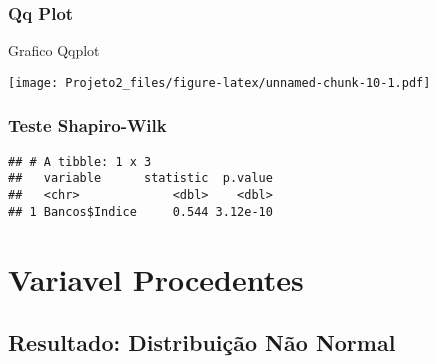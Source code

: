 \documentclass[
]{article}
\newenvironment{Shaded}{\begin{snugshade}}{\end{snugshade}}
\newcommand{\AttributeTok}[1]{\textcolor[rgb]{0.77,0.63,0.00}{#1}}
\newcommand{\FunctionTok}[1]{\textcolor[rgb]{0.00,0.00,0.00}{#1}}
\newcommand{\NormalTok}[1]{#1}
\newcommand{\SpecialCharTok}[1]{\textcolor[rgb]{0.00,0.00,0.00}{#1}}
\newcommand{\StringTok}[1]{\textcolor[rgb]{0.31,0.60,0.02}{#1}}
\begin{document}
\hypertarget{qq-plot}{%
\subsubsection{Qq Plot}\label{qq-plot}}

Grafico Qqplot

\begin{Shaded}
\end{Shaded}

\texttt{[image: Projeto2\_files/figure-latex/unnamed-chunk-10-1.pdf]}

\hypertarget{teste-shapiro-wilk}{%
\subsubsection{Teste Shapiro-Wilk}\label{teste-shapiro-wilk}}

\begin{Shaded}
\end{Shaded}

\begin{verbatim}
## # A tibble: 1 x 3
##   variable      statistic  p.value
##   <chr>             <dbl>    <dbl>
## 1 Bancos$Indice     0.544 3.12e-10
\end{verbatim}

\hypertarget{variavel-procedentes}{%
\section{Variavel Procedentes}\label{variavel-procedentes}}

\hypertarget{resultado-distribuiuxe7uxe3o-nuxe3o-normal}{%
\subsection{Resultado: Distribuição Não
Normal}\label{resultado-distribuiuxe7uxe3o-nuxe3o-normal}}
\end{document}
